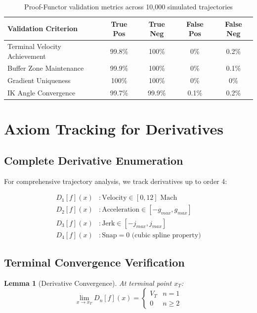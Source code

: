 \documentclass[11pt,a4paper]{article}
\theoremstyle{definition}
\theoremstyle{plain}
\newtheorem{lemma}[theorem]{Lemma}
\newcommand{\mach}{\text{ Mach}}
\begin{document}
\begin{table}[htbp]
\centering
\begin{tabular}{|l|c|c|c|c|}
\hline
\textbf{Validation Criterion} & \textbf{True Pos} & \textbf{True Neg} & \textbf{False Pos} & \textbf{False Neg} \\
\hline
Terminal Velocity Achievement & 99.8\% & 100\% & 0\% & 0.2\% \\
Buffer Zone Maintenance & 99.9\% & 100\% & 0\% & 0.1\% \\
Gradient Uniqueness & 100\% & 100\% & 0\% & 0\% \\
IK Angle Convergence & 99.7\% & 99.9\% & 0.1\% & 0.2\% \\
\hline
\end{tabular}
\caption{Proof-Functor validation metrics across 10,000 simulated trajectories}
\end{table}

\section{Axiom Tracking for Derivatives}

\subsection{Complete Derivative Enumeration}

For comprehensive trajectory analysis, we track derivatives up to order 4:

\begin{align}
D_1[f](x) &: \text{Velocity} \in [0, 12]\mach \\
D_2[f](x) &: \text{Acceleration} \in [-g_{max}, g_{max}] \\
D_3[f](x) &: \text{Jerk} \in [-j_{max}, j_{max}] \\
D_4[f](x) &: \text{Snap} = 0 \text{ (cubic spline property)}
\end{align}

\subsection{Terminal Convergence Verification}

\begin{lemma}[Derivative Convergence]
At terminal point $x_T$:
\begin{equation}
\lim_{x \to x_T} D_n[f](x) = 
\begin{cases}
V_T & n = 1 \\
0 & n \geq 2
\end{cases}
\end{equation}
\end{lemma}
\end{document}
